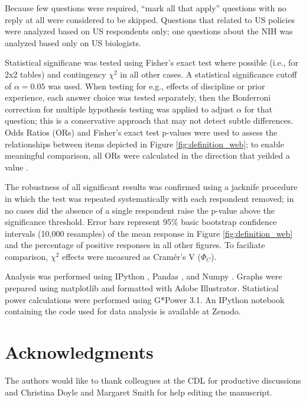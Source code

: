 \documentclass[10pt]{article}
\begin{document}
Because few questions were required,  ``mark all that apply'' questions with no reply at all were considered to be skipped.
Questions that related to US policies were analyzed based on US respondents only; one questions about the NIH was analyzed based only on US biologists.

Statistical significane was tested using Fisher's exact test where possible (i.e., for 2x2 tables) and contingency $\chi^{2}$ in all other cases\cite{agresti_statistical_1992}.
A statistical significance cutoff of $\alpha=0.05$ was used. 
When testing for e.g., effects of discipline or prior experience, each answer choice was tested separately, then the Bonferroni correction for multiple hypothesis testing was applied to adjust $\alpha$ for that question; this is a conservative approach that may not detect subtle differences.
Odds Ratios (ORs)\cite{szumilas_explaining_2010} and Fisher's exact test p-values were used to assess the relationships between items depicted in Figure \ref{fig:definition_web}; to enable meaningful comparison, all ORs were calculated in the direction that yeilded a value .

The robustness of all significant results was confirmed using a jacknife procedure in which the test was repeated systematically with each respondent removed; in no cases did the absence of a single respondent raise the p-value above the significance threshold.
Error bars represent 95\% basic bootstrap confidence intervals (10,000 resamples) of the mean response in Figure \ref{fig:definition_web} and the percentage of positive responses in all other figures.
To faciliate comparison, $\chi^{2}$ effects were measured as Cram\'er's V ($\Phi_{C}$)\cite{cramer_mathematical_1999}.

Analysis was performed using IPython \cite{perez_ipython:_2007}, Pandas \cite{mckinney_data_2010}, and Numpy \cite{van_der_walt_numpy_2011}.
Graphs were prepared using matplotlib \cite{hunter_matplotlib:_2007} and formatted with Adobe Illustrator.
Statistical power calculations were performed using G*Power 3.1\cite{faul_g*_2007}.
An IPython notebook containing the code used for data analysis is available at Zenodo\cite{kratz_researcher_2014}.


\section*{Acknowledgments}
The authors would like to thank colleagues at the CDL for productive discussions and Christina Doyle and Margaret Smith for help editing the manuscript.
\end{document}
